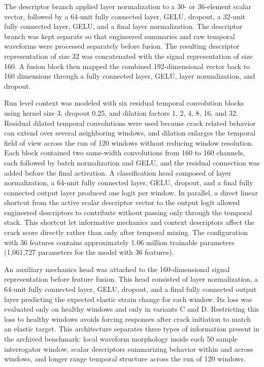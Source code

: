 \documentclass[fleqn,10pt]{wlscirep}
\begin{document}
The descriptor branch applied layer normalization to a 30- or 36-element scalar vector, followed by a 64-unit fully connected layer, GELU, dropout, a 32-unit fully connected layer, GELU, and a final layer normalization. The descriptor branch was kept separate so that engineered summaries and raw temporal waveforms were processed separately before fusion. The resulting descriptor representation of size 32 was concatenated with the signal representation of size 160. A fusion block then mapped the combined 192-dimensional vector back to 160 dimensions through a fully connected layer, GELU, layer normalization, and dropout.

Run level context was modeled with six residual temporal convolution blocks using kernel size 3, dropout 0.25, and dilation factors 1, 2, 4, 8, 16, and 32. Residual dilated temporal convolutions were used because crack related behavior can extend over several neighboring windows, and dilation enlarges the temporal field of view across the run of 120 windows without reducing window resolution. Each block contained two same-width convolutions from 160 to 160 channels, each followed by batch normalization and GELU, and the residual connection was added before the final activation. A classification head composed of layer normalization, a 64-unit fully connected layer, GELU, dropout, and a final fully connected output layer produced one logit per window. In parallel, a direct linear shortcut from the active scalar descriptor vector to the output logit allowed engineered descriptors to contribute without passing only through the temporal stack. This shortcut let informative mechanics and context descriptors affect the crack score directly rather than only after temporal mixing. The configuration with 36 features contains approximately 1.06 million trainable parameters (1,061,727 parameters for the model with 36 features).

An auxiliary mechanics head was attached to the 160-dimensional signal representation before feature fusion. This head consisted of layer normalization, a 64-unit fully connected layer, GELU, dropout, and a final fully connected output layer predicting the expected elastic strain change for each window. Its loss was evaluated only on healthy windows and only in variants C and D. Restricting this loss to healthy windows avoids forcing responses after crack initiation to match an elastic target. This architecture separates three types of information present in the archived benchmark: local waveform morphology inside each 50 sample interrogator window, scalar descriptors summarizing behavior within and across windows, and longer range temporal structure across the run of 120 windows.
\end{document}
